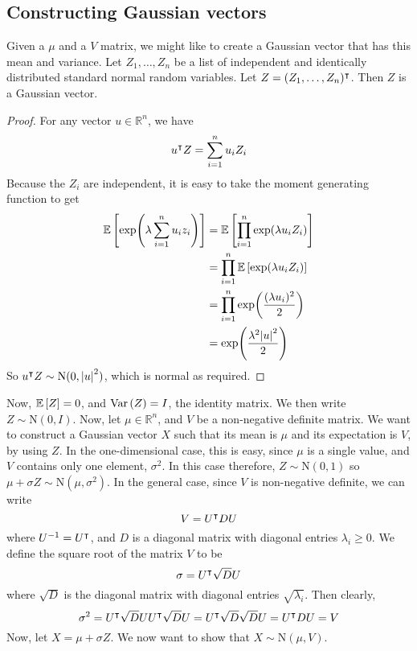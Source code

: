 \subsection{Constructing Gaussian vectors}
Given a \(\mu\) and a \(V\) matrix, we might like to create a Gaussian vector that has this mean and variance.
Let \(Z_1, \dots, Z_n\) be a list of independent and identically distributed standard normal random variables.
Let \(Z = (Z_1, \dots, Z_n)^\intercal\).
Then \(Z\) is a Gaussian vector.
\begin{proof}
	For any vector \(u \in \mathbb R^n\), we have
	\[
		u^\intercal Z = \sum_{i=1}^n u_i Z_i
	\]
	Because the \(Z_i\) are independent, it is easy to take the moment generating function to get
	\begin{align*}
		\mathbb{E}\left[{\exp(\lambda \sum_{i=1}^n u_i z_i)}\right] &= \mathbb{E}\left[{\prod_{i=1}^n \exp(\lambda u_i Z_i)}\right] \\
		&= \prod_{i=1}^n \mathbb{E}\left[{\exp(\lambda u_i Z_i)}\right] \\
		&= \prod_{i=1}^n \exp(\frac{(\lambda u_i)^2}{2}) \\
		&= \exp(\frac{\lambda^2 \abs{u}^2}{2})
	\end{align*}
	So \(u^\intercal Z \sim \mathrm{N}(0, \abs{u}^2)\), which is normal as required.
\end{proof}
Now, \(\mathbb{E}\left[{Z}\right] = 0\), and \(\operatorname{Var}\left({Z}\right) = I\), the identity matrix.
We then write \(Z \sim \mathrm{N}(0, I)\).
Now, let \(\mu \in \mathbb R^n\), and \(V\) be a non-negative definite matrix.
We want to construct a Gaussian vector \(X\) such that its mean is \(\mu\) and its expectation is \(V\), by using \(Z\).
In the one-dimensional case, this is easy, since \(\mu\) is a single value, and \(V\) contains only one element, \(\sigma^2\).
In this case therefore, \(Z \sim \mathrm{N}(0, 1)\) so \(\mu + \sigma Z \sim \mathrm{N}(\mu, \sigma^2)\).
In the general case, since \(V\) is non-negative definite, we can write
\[
	V = U^\intercal DU
\]
where \(U^{-1} = U^\intercal\), and \(D\) is a diagonal matrix with diagonal entries \(\lambda_i \geq 0\).
We define the square root of the matrix \(V\) to be
\[
	\sigma = U^\intercal \sqrt{D} U
\]
where \(\sqrt{D}\) is the diagonal matrix with diagonal entries \(\sqrt{\lambda_i}\).
Then clearly,
\[
	\sigma^2 = U^\intercal \sqrt{D} U U^\intercal \sqrt{D} U = U^\intercal \sqrt{D} \sqrt{D} U = U^\intercal DU = V
\]
Now, let \(X = \mu + \sigma Z\).
We now want to show that \(X \sim \mathrm{N}(\mu, V)\).
